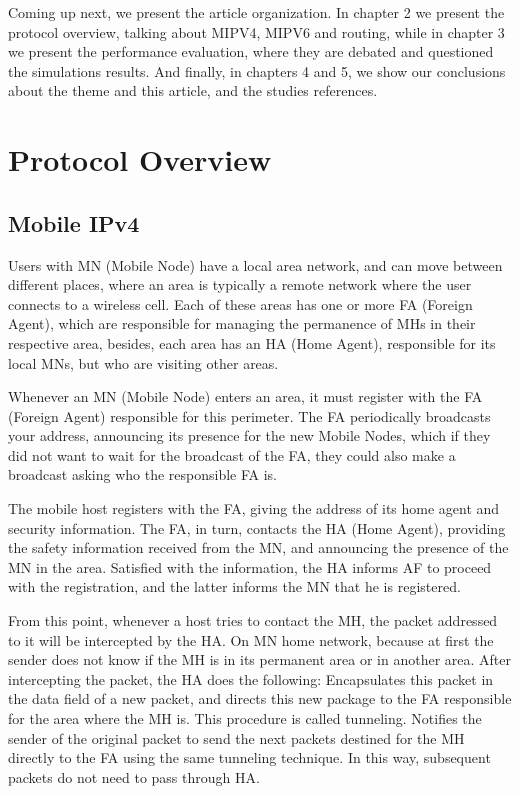 \documentclass[12pt]{article}
\begin{document}
Coming up next, we present the article organization.  In chapter 2 we present the protocol overview, talking about MIPV4, MIPV6 and routing, while in chapter 3 we present the performance evaluation, where they are debated and questioned the simulations results. And finally, in chapters 4 and 5, we show our conclusions about the theme and this
article, and the studies references.

\section{Protocol Overview} \label{sec:firstpage}
\subsection{Mobile IPv4}

Users with MN (Mobile Node) have a local area network, and can move between different places, where an area is typically a remote network where the user connects to a wireless cell. Each of these areas has one or more FA (Foreign Agent), which are responsible for managing the permanence of MHs in their respective area, besides, each area has an HA (Home Agent), responsible for its local MNs, but who are visiting other areas.

Whenever an MN (Mobile Node) enters an area, it must register with the FA (Foreign Agent) responsible for this perimeter. The FA periodically broadcasts your address, announcing its presence for the new Mobile Nodes, which if they did not want to wait for the broadcast of the FA, they could also make a broadcast asking who the responsible FA is.

The mobile host registers with the FA, giving the address of its home agent and security information. The FA, in turn, contacts the HA (Home Agent), providing the safety information received from the MN, and announcing the presence of the MN in the area. Satisfied with the information, the HA informs AF to proceed with the registration, and the latter informs the MN that he is registered.

From this point, whenever a host tries to contact the MH, the packet addressed to it will be intercepted by the HA. On MN home network, because at first the sender does not know if the MH is in its permanent area or in another area. After intercepting the packet, the HA does the following: Encapsulates this packet in the data field of a new packet, and directs this new package to the FA responsible for the area where the MH is. This procedure is called tunneling. Notifies the sender of the original packet to send the next packets destined for the MH directly to the FA using the same tunneling technique. In this way, subsequent packets do not need to pass through HA.
\end{document}
